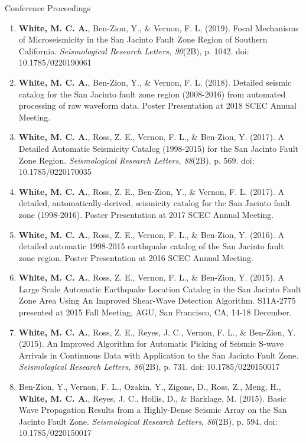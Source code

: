 \begin{rSection}{Conference Proceedings}
\begin{enumerate}
		\item \textbf{White, M. C. A.}, Ben-Zion, Y., \& Vernon, F. L. (2019). Focal Mechanisms of Microseismicity in the San Jacinto Fault Zone Region of Southern California. \textit{Seismological Research Letters, 90}(2B), p. 1042. doi: 10.1785/0220190061
		
		\item \textbf{White, M. C. A.}, Ben-Zion, Y., \& Vernon, F. L. (2018). Detailed seismic catalog for the San Jacinto fault zone region (2008-2016) from automated processing of raw waveform data. Poster Presentation at 2018 SCEC Annual Meeting.
		
		\item \textbf{White, M. C. A.}, Ross, Z. E., Vernon, F. L., \& Ben-Zion, Y. (2017). A Detailed Automatic Seismicity Catalog (1998-2015) for the San Jacinto Fault Zone Region. \textit{Seismological Research Letters, 88}(2B), p. 569. doi: 10.1785/0220170035
		
		\item \textbf{White, M. C. A.}, Ross, Z. E., Ben-Zion, Y., \& Vernon, F. L. (2017). A detailed, automatically-derived, seismicity catalog for the San Jacinto fault zone (1998-2016). Poster Presentation at 2017 SCEC Annual Meeting.
		
		\item \textbf{White, M. C. A.}, Ross, Z. E., Vernon, F. L., \& Ben-Zion, Y. (2016). A detailed automatic 1998-2015 earthquake catalog of the San Jacinto fault zone region. Poster Presentation at 2016 SCEC Annual Meeting.
		
		\item \textbf{White, M. C. A.}, Ross, Z. E., Vernon, F. L., \& Ben-Zion, Y. (2015). A Large Scale Automatic Earthquake Location Catalog in the San Jacinto Fault Zone Area Using An Improved Shear-Wave Detection Algorithm. S11A-2775 presented at 2015 Fall Meeting, AGU, San Francisco, CA, 14-18 December.
		
		\item \textbf{White, M. C. A.}, Ross, Z. E., Reyes, J. C., Vernon, F. L., \& Ben-Zion, Y. (2015). An Improved Algorithm for Automatic Picking of Seismic S-wave Arrivals in Continuous Data with Application to the San Jacinto Fault Zone. \textit{Seismological Research Letters, 86}(2B), p. 731. doi: 10.1785/0220150017
		
		\item Ben-Zion, Y., Vernon, F. L., Ozakin, Y., Zigone, D., Ross, Z., Meng, H., \textbf{White, M. C. A.}, Reyes, J. C., Hollis, D., \& Barklage, M. (2015). Basic Wave Propagation Results from a Highly-Dense Seismic Array on the San Jacinto Fault Zone. \textit{Seismological Research Letters, 86}(2B), p. 594. doi: 10.1785/0220150017
		

\end{enumerate}
\end{rSection}
